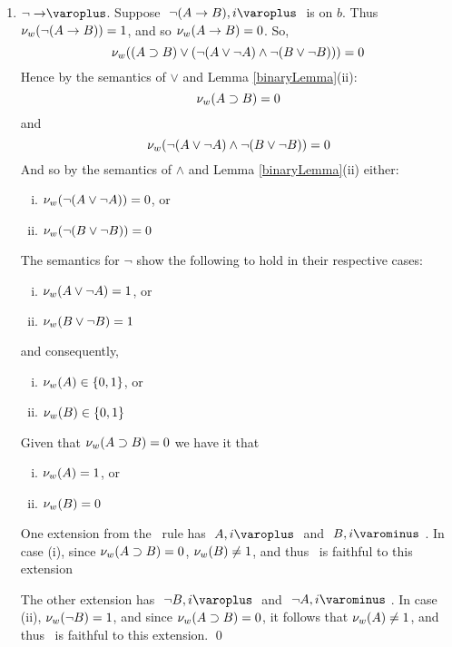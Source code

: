 \begin{proof*}
\begin{enumerate}
		\item $\dRule{ \neg\arrow }$. Suppose $ \like{ \dNode{ \neg (A \arrow B) }{ i } } $ is on $ b $.
							Thus $ \mathcal{\nu}_{ w }({ \neg (A \rightarrow B ) }) = 1 $, and so $ \mathcal{\nu}_{ w }({ A \rightarrow B }) = 0 $.
							So,
							\[ \mathcal{\nu}_{ w }({ (A \supset B) \vee ( \neg (A \vee \neg A) \wedge \neg (B \vee \neg B )) }) = 0 \]
							Hence by the semantics of $\vee$ and Lemma \ref{binaryLemma}(ii):
							\[	\mathcal{\nu}_{ w }({ A \supset B }) = 0 \]
							and
							\[	\mathcal{\nu}_{ w }({ \neg (A \vee \neg A) \wedge \neg (B \vee \neg B) }) = 0 \]
							And so by the semantics of $\wedge$ and Lemma \ref{binaryLemma}(ii) either: 
							\begin{enumerate}[(i)]
								\item $ \mathcal{\nu}_{ w }({ \neg (A \vee \neg A ) }) = 0 $, or
								\item $ \mathcal{\nu}_{ w }({ \neg (B \vee \neg B ) }) = 0 $
							\end{enumerate}
							The semantics for $\neg$ show the following to hold in their respective cases:
							\begin{enumerate}[(i)]
								\item $ \mathcal{\nu}_{ w }({ A \vee \neg A }) = 1 $, or
								\item $ \mathcal{\nu}_{ w }({ B \vee \neg B }) = 1 $
							\end{enumerate}
							and consequently,
							\begin{enumerate}[(i)]
								\item $ \mathcal{\nu}_{ w }({ A }) \in \left\{{0,1}\right\}$, or
								\item $ \mathcal{\nu}_{ w }({ B }) \in \left\{{0,1}\right\}$
							\end{enumerate}
							Given that $ \mathcal{\nu}_{ w }({ A \supset B }) = 0 $ we have it that
							\begin{enumerate}[(i)]
								\item $ \mathcal{\nu}_{ w }({ A }) = 1 $, or
								\item $ \mathcal{\nu}_{ w }({ B }) = 0 $
							\end{enumerate}
							One extension from the \dRule{ \neg \arrow }\ rule has $ \like{ \dNodei{A}} $ and $\like{\uNodei{B}}$.
							In case (i), since $ \mathcal{\nu}_{ w }({ A \supset B }) = 0 $, $ \mathcal{\nu}_{ w }({B}) \neq 1 $, and thus \Model\ is faithful to this extension
							
							The other extension has $ \like{ \dNodei{ \neg B }} $ and $ \like{\uNodei{ \neg A }} $.
							In case (ii), $ \mathcal{\nu}_{ w }({ \neg B }) = 1 $, and since $ \mathcal{\nu}_{ w }({ A \supset B }) = 0 $, it follows that $ \mathcal{\nu}_{ w }({A}) \neq 1 $, 
							and thus \Model\ is faithful to this extension.
							\qed
							


\end{enumerate}
\end{proof*}
